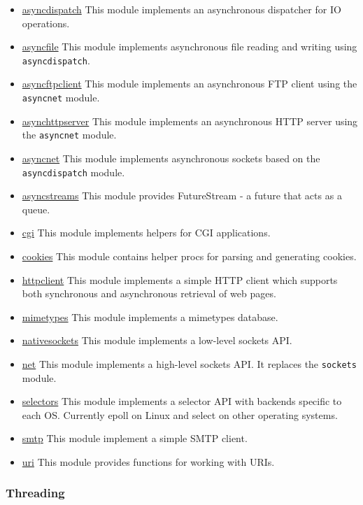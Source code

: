 \begin{itemize}
\tightlist
\item
  \href{asyncdispatch.html}{asyncdispatch} This module implements an
  asynchronous dispatcher for IO operations.
\item
  \href{asyncfile.html}{asyncfile} This module implements asynchronous
  file reading and writing using \texttt{asyncdispatch}.
\item
  \href{asyncftpclient.html}{asyncftpclient} This module implements an
  asynchronous FTP client using the \texttt{asyncnet} module.
\item
  \href{asynchttpserver.html}{asynchttpserver} This module implements an
  asynchronous HTTP server using the \texttt{asyncnet} module.
\item
  \href{asyncnet.html}{asyncnet} This module implements asynchronous
  sockets based on the \texttt{asyncdispatch} module.
\item
  \href{asyncstreams.html}{asyncstreams} This module provides
  {FutureStream} - a future that acts as a queue.
\item
  \href{cgi.html}{cgi} This module implements helpers for CGI
  applications.
\item
  \href{cookies.html}{cookies} This module contains helper procs for
  parsing and generating cookies.
\item
  \href{httpclient.html}{httpclient} This module implements a simple
  HTTP client which supports both synchronous and asynchronous retrieval
  of web pages.
\item
  \href{mimetypes.html}{mimetypes} This module implements a mimetypes
  database.
\item
  \href{nativesockets.html}{nativesockets} This module implements a
  low-level sockets API.
\item
  \href{net.html}{net} This module implements a high-level sockets API.
  It replaces the \texttt{sockets} module.
\item
  \href{selectors.html}{selectors} This module implements a selector API
  with backends specific to each OS. Currently epoll on Linux and select
  on other operating systems.
\item
  \href{smtp.html}{smtp} This module implement a simple SMTP client.
\item
  \href{uri.html}{uri} This module provides functions for working with
  URIs.
\end{itemize}

\hypertarget{threading}{%
\subsubsection{Threading}\label{threading}}

